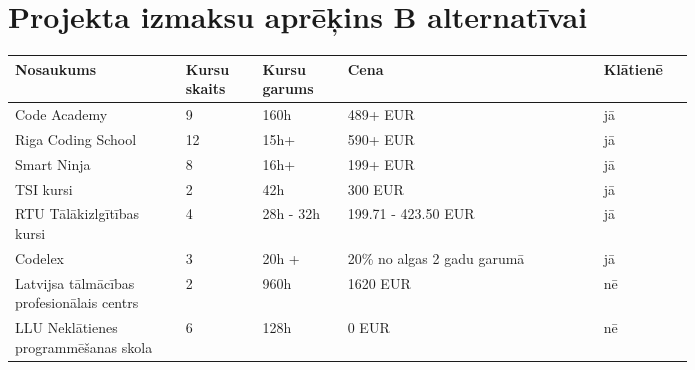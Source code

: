 \section{Projekta izmaksu aprēķins B alternatīvai}
\begin{table}[!ht]
    \center
    \begin{tabular}{|p{0.2\linewidth}|p{0.09\linewidth}|p{0.1\linewidth}|p{0.3\linewidth}|p{0.1\linewidth}|}
        \hline
        \textbf{Nosaukums} & \textbf{Kursu skaits} & \textbf{Kursu garums} & \textbf{Cena} & \textbf{Klātienē} \\ 
        \hline
        Code Academy & 9 & 160h & 489+ EUR & jā \\
        \hline
        Riga Coding School & 12 & 15h+ & 590+ EUR & jā \\
        \hline
        Smart Ninja & 8 & 16h+ & 199+ EUR & jā \\
        \hline
        TSI kursi & 2 & 42h & 300 EUR & jā \\
        \hline 
        RTU Tālākizlgītības kursi & 4 & 28h - 32h & 199.71 - 423.50 EUR & jā \\
        \hline
        Codelex & 3 & 20h + & 20\% no algas 2 gadu garumā & jā \\
        \hline
        Latvijsa tālmācības profesionālais centrs & 2 & 960h & 1620  EUR & nē \\
        \hline
        LLU Neklātienes programmēšanas skola & 6 & 128h & 0 EUR & nē \\
        \hline
    \end{tabular}
\end{table}
\label{app:pieejamo_kursu_aspkats}
\clearpage